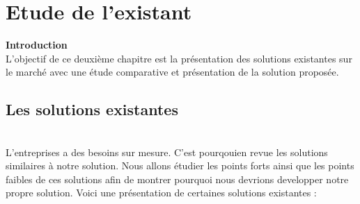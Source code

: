 \chapter{ Etude de l'existant}
\newpage
\textbf{\huge Introduction} \\[1cm]
\textsf{\selectfont{}
L’objectif de ce deuxième chapitre est la présentation des solutions existantes sur le marché avec une étude comparative et présentation de la solution proposée.
}\\[0.1cm]


\section{\LARGE Les solutions existantes}
\texttt{}\\[0.1cm]
\textsf{\selectfont{} L'entreprises a des besoins sur mesure. C'est pourqouien revue les solutions similaires à notre solution. Nous allons étudier les points forts ainsi que les points faibles de ces solutions afin de montrer pourquoi nous devrions developper notre propre solution. Voici une présentation de certaines solutions existantes :}
